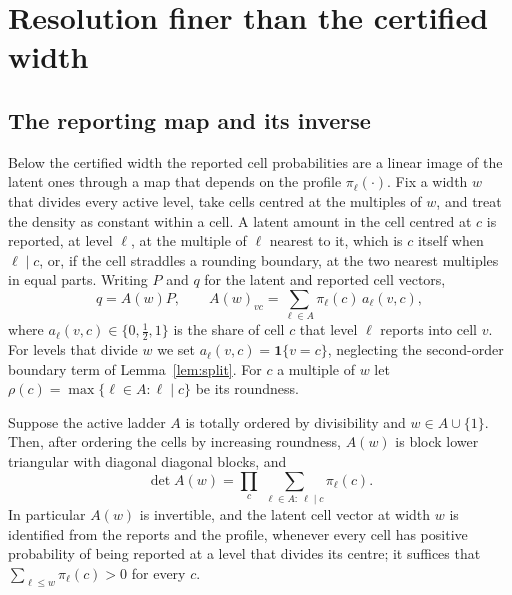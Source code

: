 \section{Resolution finer than the certified width}\label{sec:inversion}

\subsection{The reporting map and its inverse}

Below the certified width the reported cell probabilities are a linear image of the latent ones through a map that depends on the profile $\pi_\ell(\cdot)$. Fix a width $w$ that divides every active level, take cells centred at the multiples of $w$, and treat the density as constant within a cell. A latent amount in the cell centred at $c$ is reported, at level $\ell$, at the multiple of $\ell$ nearest to it, which is $c$ itself when $\ell\mid c$, or, if the cell straddles a rounding boundary, at the two nearest multiples in equal parts. Writing $P$ and $q$ for the latent and reported cell vectors,
\begin{equation}\label{eq:map}
q=A(w)P,\qquad A(w)_{vc}=\sum_{\ell\in A}\pi_\ell(c)\,a_\ell(v,c),
\end{equation}
where $a_\ell(v,c)\in\{0,\tfrac12,1\}$ is the share of cell $c$ that level $\ell$ reports into cell $v$. For levels that divide $w$ we set $a_\ell(v,c)=\mathbf 1\{v=c\}$, neglecting the second-order boundary term of Lemma~\ref{lem:split}. 
For $c$ a multiple of $w$ let $\rho(c)=\max\{\ell\in A:\ell\mid c\}$ be its roundness.

\begin{theorem}\label{thm:invert}
Suppose the active ladder $A$ is totally ordered by divisibility and $w\in A\cup\{1\}$. Then, after ordering the cells by increasing roundness, $A(w)$ is block lower triangular with diagonal diagonal blocks, and
\[
\det A(w)=\prod_c\ \sum_{\ell\in A:\ \ell\mid c}\pi_\ell(c).
\]
In particular $A(w)$ is invertible, and the latent cell vector at width $w$ is identified from the reports and the profile, whenever every cell has positive probability of being reported at a level that divides its centre; it suffices that $\sum_{\ell\le w}\pi_\ell(c)>0$ for every $c$.
\end{theorem}

